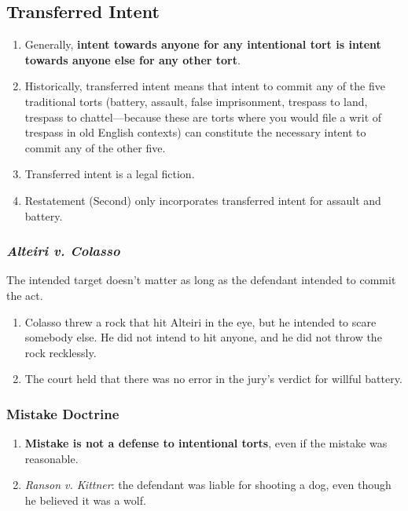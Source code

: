 \subsection{Transferred Intent}

\begin{enumerate}
    \item Generally, \textbf{intent towards anyone for any intentional tort is 
    intent towards anyone else for any other tort}.
    \item Historically, transferred intent means that intent to commit any of 
    the five traditional torts (battery, assault, false imprisonment, trespass 
    to land, trespass to chattel---because these are torts where you would 
    file a writ of trespass in old English contexts) can constitute the 
    necessary intent to commit any of the other five.
    \item Transferred intent is a legal fiction.
    \item Restatement (Second) only incorporates transferred intent for 
    assault and battery.
\end{enumerate}

\subsubsection{\emph{Alteiri v. Colasso}}

The intended target doesn't matter as long as the defendant intended to commit 
the act.

\begin{enumerate}
    \item Colasso threw a rock that hit Alteiri in the eye, but he intended to 
    scare somebody else. He did not intend to hit anyone, and he did not throw 
    the rock recklessly.
    \item The court held that there was no error in the jury's verdict for 
    willful battery.
\end{enumerate}

\subsubsection{Mistake Doctrine}

\begin{enumerate}
    \item \textbf{Mistake is not a defense to intentional torts}, even if the mistake 
    was reasonable.
    \item \emph{Ranson v. Kittner}: the defendant was liable for shooting a 
    dog, even though he believed it was a wolf.
\end{enumerate}

